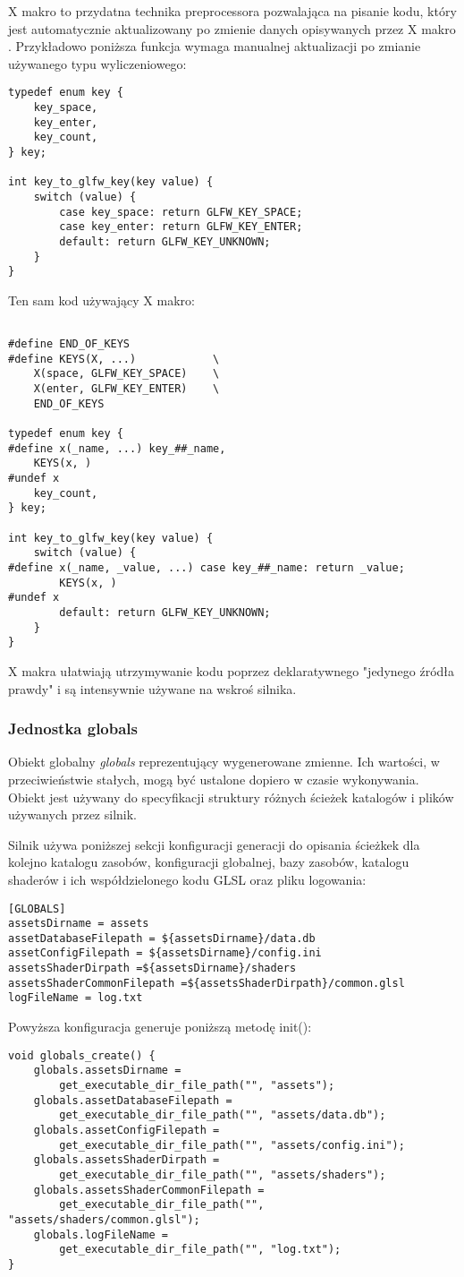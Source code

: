 X makro to przydatna technika preprocessora pozwalająca na pisanie kodu, który jest automatycznie aktualizowany po zmienie danych opisywanych przez X makro \cite{XMACRO}.
Przykładowo poniższa funkcja wymaga manualnej aktualizacji po zmianie używanego typu wyliczeniowego:
\lstset{language=C}
\begin{lstlisting}
typedef enum key {
	key_space,
	key_enter,
	key_count,
} key;

int key_to_glfw_key(key value) {
	switch (value) {
		case key_space: return GLFW_KEY_SPACE;
		case key_enter: return GLFW_KEY_ENTER;
		default: return GLFW_KEY_UNKNOWN;
	}
}
\end{lstlisting}
Ten sam kod używający X makro:
\lstset{language=C}
\begin{lstlisting}

#define END_OF_KEYS
#define KEYS(X, ...)			\
	X(space, GLFW_KEY_SPACE)	\
	X(enter, GLFW_KEY_ENTER)	\
	END_OF_KEYS

typedef enum key {
#define x(_name, ...) key_##_name,
	KEYS(x, )
#undef x
	key_count,
} key;

int key_to_glfw_key(key value) {
	switch (value) {
#define x(_name, _value, ...) case key_##_name: return _value;
		KEYS(x, )
#undef x
		default: return GLFW_KEY_UNKNOWN;
	}
}
\end{lstlisting}
X makra ułatwiają utrzymywanie kodu poprzez deklaratywnego "jedynego źródła prawdy" i są intensywnie używane na wskroś silnika.

\subsubsection{Jednostka globals}
Obiekt globalny \textit{globals} reprezentujący wygenerowane zmienne.
Ich wartości, w przeciwieństwie stałych, mogą być ustalone dopiero w czasie wykonywania.
Obiekt jest używany do specyfikacji struktury różnych ścieżek katalogów i plików używanych przez silnik.

Silnik używa poniższej sekcji konfiguracji generacji do opisania ścieżkek dla kolejno katalogu zasobów, konfiguracji globalnej, bazy zasobów, katalogu shaderów i ich współdzielonego kodu GLSL oraz pliku logowania:
\begin{verbatim}
[GLOBALS]
assetsDirname = assets
assetDatabaseFilepath = ${assetsDirname}/data.db
assetConfigFilepath = ${assetsDirname}/config.ini
assetsShaderDirpath =${assetsDirname}/shaders
assetsShaderCommonFilepath =${assetsShaderDirpath}/common.glsl
logFileName = log.txt
\end{verbatim}
Powyższa konfiguracja generuje poniższą metodę init():
\lstset{language=C}
\begin{lstlisting}
void globals_create() {
	globals.assetsDirname =
		get_executable_dir_file_path("", "assets");
	globals.assetDatabaseFilepath =
		get_executable_dir_file_path("", "assets/data.db");
	globals.assetConfigFilepath =
		get_executable_dir_file_path("", "assets/config.ini");
	globals.assetsShaderDirpath =
		get_executable_dir_file_path("", "assets/shaders");
	globals.assetsShaderCommonFilepath =
  		get_executable_dir_file_path("", "assets/shaders/common.glsl");
	globals.logFileName =
		get_executable_dir_file_path("", "log.txt");
}
\end{lstlisting}

